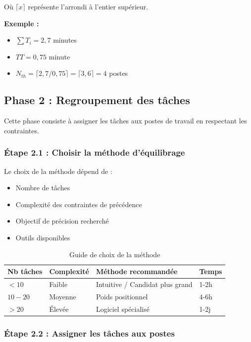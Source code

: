 \documentclass[12pt,a4paper]{article}
\begin{document}
Où $\lceil x \rceil$ représente l'arrondi à l'entier supérieur.

\textbf{Exemple :}
\begin{itemize}
    \item $\sum T_i = 2,7$ minutes
    \item $TT = 0,75$ minute
    \item $N_{th} = \lceil 2,7 / 0,75 \rceil = \lceil 3,6 \rceil = 4$ postes
\end{itemize}

\subsection{Phase 2 : Regroupement des tâches}

Cette phase consiste à assigner les tâches aux postes de travail en respectant les contraintes.

\subsubsection{Étape 2.1 : Choisir la méthode d'équilibrage}

Le choix de la méthode dépend de :
\begin{itemize}
    \item Nombre de tâches
    \item Complexité des contraintes de précédence
    \item Objectif de précision recherché
    \item Outils disponibles
\end{itemize}

\begin{table}[H]
\centering
\begin{tabular}{|p{3cm}|p{3cm}|p{3cm}|p{3cm}|}
\hline
\textbf{Nb tâches} & \textbf{Complexité} & \textbf{Méthode recommandée} & \textbf{Temps} \\
\hline
$< 10$ & Faible & Intuitive / Candidat plus grand & 1-2h \\
\hline
$10 - 20$ & Moyenne & Poids positionnel & 4-6h \\
\hline
$> 20$ & Élevée & Logiciel spécialisé & 1-2j \\
\hline
\end{tabular}
\caption{Guide de choix de la méthode}
\end{table}

\subsubsection{Étape 2.2 : Assigner les tâches aux postes}
\end{document}
